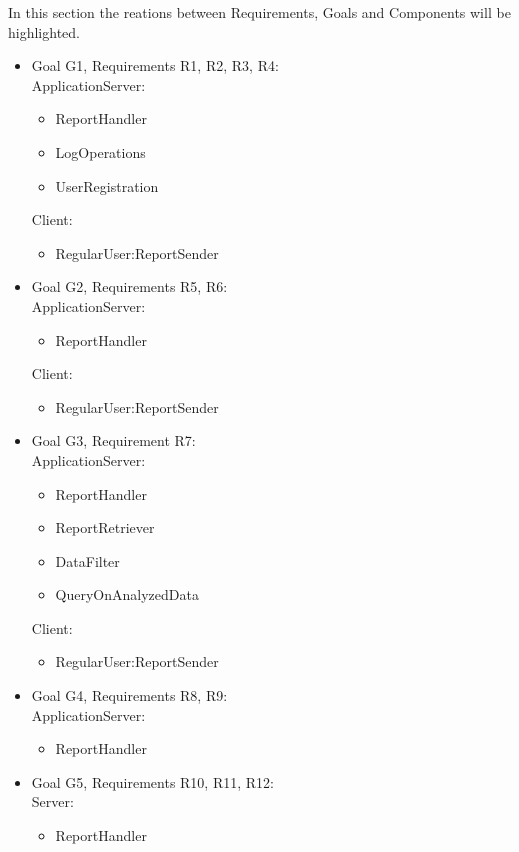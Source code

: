 In this section the reations between Requirements, Goals and Components will be highlighted.\\

\begin{itemize}
	\item Goal G1, Requirements R1, R2, R3, R4: \\ ApplicationServer:
	\begin{itemize}
		\item ReportHandler
		\item LogOperations
		\item UserRegistration
	\end{itemize}
	Client:
	\begin{itemize}
		\item RegularUser:ReportSender
	\end{itemize}
	\item Goal G2, Requirements R5, R6:\\
	ApplicationServer:
	\begin{itemize}
		\item ReportHandler
	\end{itemize}
	Client:	
	\begin{itemize}
		\item RegularUser:ReportSender
	\end{itemize}
	\item Goal G3, Requirement R7:\\ApplicationServer:
	\begin{itemize}
		\item ReportHandler
		\item ReportRetriever
		\item DataFilter
		\item QueryOnAnalyzedData
	\end{itemize}
	Client:
	\begin{itemize}
		\item RegularUser:ReportSender
	\end{itemize}
	\item Goal G4, Requirements R8, R9:\\ApplicationServer:
	\begin{itemize}
		\item ReportHandler
	\end{itemize}
	\item Goal G5, Requirements R10, R11, R12:\\Server:
	\begin{itemize}
		\item ReportHandler

\end{itemize}
\end{itemize}
